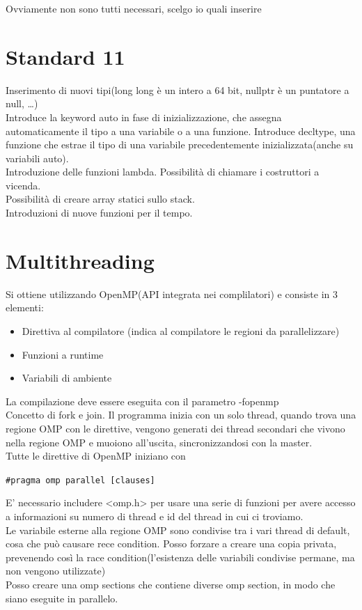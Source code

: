 Ovviamente non sono tutti necessari, scelgo io quali inserire

\chapter{Standard 11}
Inserimento di nuovi tipi(long long è un intero a 64 bit, nullptr è un puntatore a null, \dots) \\
Introduce la keyword auto in fase di inizializzazione, che assegna automaticamente il tipo a una variabile o a una funzione.
Introduce decltype, una funzione che estrae il tipo di una variabile precedentemente inizializzata(anche su variabili auto).\\ 
Introduzione delle funzioni lambda.
Possibilità di chiamare i costruttori a vicenda.\\
Possibilità di creare array statici sullo stack.\\
Introduzioni di nuove funzioni per il tempo.\\

\chapter{Multithreading}
Si ottiene utilizzando OpenMP(API integrata nei complilatori) e consiste in 3 elementi:

\begin{itemize}
\item Direttiva al compilatore (indica al compilatore le regioni da parallelizzare)
\item Funzioni a runtime
\item Variabili di ambiente
\end{itemize}

La compilazione deve essere eseguita con il parametro -fopenmp \\
Concetto di fork e join. Il programma inizia con un solo thread, quando trova una regione OMP con le direttive, vengono generati dei thread secondari che vivono nella regione OMP e muoiono all'uscita, sincronizzandosi con la master.\\
Tutte le direttive di OpenMP iniziano con

\begin{tcolorbox}
\verb|#pragma omp parallel [clauses]|
\end{tcolorbox}

E' necessario includere <omp.h> per usare una serie di funzioni per avere accesso a informazioni su numero di thread e id del thread in cui ci troviamo.\\
Le variabile esterne alla regione OMP sono condivise tra i vari thread di default, cosa che può causare rece condition. Posso forzare a creare una copia privata, prevenendo così la race condition(l'esistenza delle variabili condivise permane, ma non vengono utilizzate)\\
Posso creare una omp sections che contiene diverse omp section, in modo che siano eseguite in parallelo.

